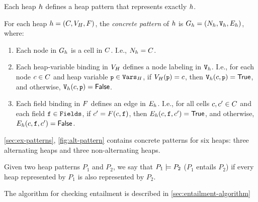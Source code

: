 Each heap $h$ defines a heap pattern that represents exactly
$h$.
%
\begin{defn}
  \label{defn:heap-pat}
  For each heap $h = (C, V_H, F)$, the
  \emph{concrete pattern} of $h$ is $G_{h} =
  (N_{h}, \mathtt{V}_{h}, E_{h})$,
  where:
  \begin{enumerate}
  \item
    Each node in $G_{h}$ is a cell in $C$.
    I.e., $N_{h} = C$.
  \item
    Each heap-variable binding in $V_H$ defines a node labeling
    in $\mathtt{V}_{h}$.
    I.e., for each node $c \in C$ and heap variable $\cc{p} \in
    \heapvars$, if $\heapvarnm(\cc{p}) = c$, then
    $\varlblnm_{\heapnm}(c, \cc{p}) = \true$, and otherwise,
    $\varlblnm_{\heapnm}(c, \cc{p}) = \false$.
  \item
    Each field binding in $F$ defines an edge in
    $E_{h}$.
    I.e., for all cells $c, c' \in C$ and each
    field $\mathtt{f} \in \mathtt{Fields}$, if $c' = F(c,
    \mathtt{f})$, then $E_{h}(c, \mathtt{f}, c')
    = \mathsf{True}$, and otherwise, $E_{h}(c, \mathtt{f},
    c') = \mathsf{False}$.
  \end{enumerate}
\end{defn}
\begin{ex}
  \label{ex:concrete-heaps-defn}
  \autoref{sec:ex-patterns}, \autoref{fig:alt-pattern} contains
  concrete patterns for six heaps: three alternating heaps and three
  non-alternating heaps.
\end{ex}

\begin{defn}
  \label{ex:pat-entails-defn}
  Given two heap patterns $P_1$ and $P_2$, we say that $P_1 \models P_2$ ($P_1$ entails $P_2$) if every heap represented by $P_1$ is also represented by $P_2$.
\end{defn}

The algorithm for checking entailment is described in \autoref{sec:entailment-algorithm}

